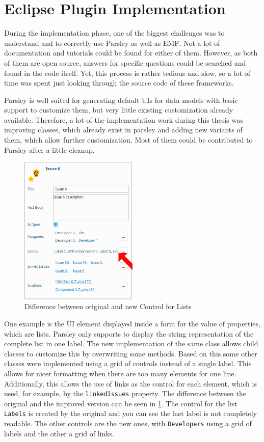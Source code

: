 \section{Eclipse Plugin Implementation}
\label{sec:ch4:s4}
During the implementation phase, one of the biggest challenges was to understand and to correctly use \gls{Parsley} as well as \gls{EMF}.
Not a lot of documentation and tutorials could be found for either of them.
However, as both of them are open source, answers for specific questions could be searched and found in the code itself.
Yet, this process is rather tedious and slow, so a lot of time was spent just looking through the source code of these frameworks.

\Gls{Parsley} is well suited for generating default \glspl{UI} for data models with basic support to customize them, 
but very little existing customization already available.
Therefore, a lot of the implementation work during this thesis was improving classes, which already exist in parsley 
and adding new variants of them, which allow further customization.
Most of them could be contributed to \gls{Parsley} after a little cleanup.

\begin{figure}[!h]
	\centering
	\includegraphics[width=0.5\textwidth]{graphics/screenshot_improvement_fromControl_arrow.png}
	\caption{Difference between original and new Control for Lists}
	\label{fig:c4:screenshot_improvement_formControl}
\end{figure}
One example is the \gls{UI} element displayed inside a form for the value of properties, which are lists.
Parsley only supports to display the string representation of the complete list in one label.
The new implementation of the same class allows child classes to customize this by overwriting some methods.
Based on this some other classes were implemented using a grid of controls instead of a single label.
This allows for nicer formatting when there are too many elements for one line.
Additionally, this allows the use of links as the control for each element, which is used, for example, by the \lstinline|linkedIssues| property.
The difference between the original and the improved version can be seen in \cref{fig:c4:screenshot_improvement_formControl}.
The control for the list \lstinline|Labels| is created by the original and you can see the last label is not completely readable.
The other controls are the new ones, with \lstinline|Developers| using a grid of labels and the other a grid of links.

